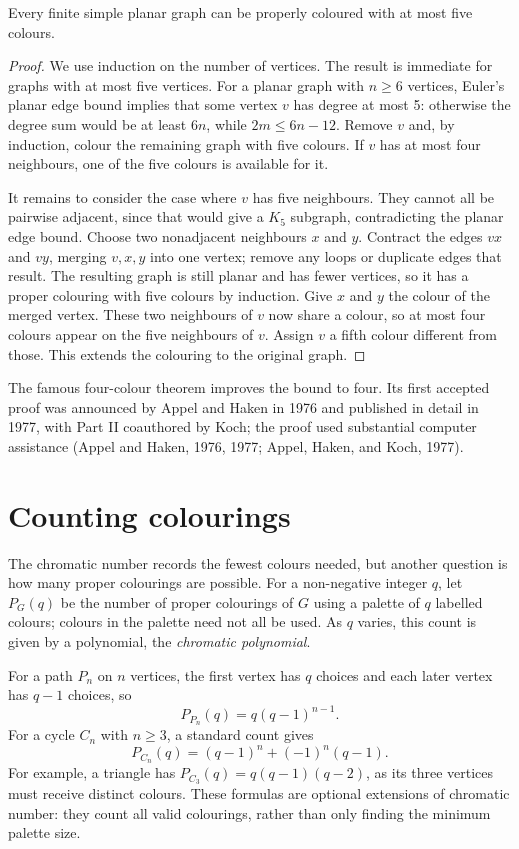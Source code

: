 \begin{theorem}
Every finite simple planar graph can be properly coloured with at most five colours.
\end{theorem}
\begin{proof}
We use induction on the number of vertices. The result is immediate for graphs with at most five vertices. For a planar graph with $n\geq 6$ vertices, Euler's planar edge bound implies that some vertex $v$ has degree at most 5: otherwise the degree sum would be at least $6n$, while $2m\leq 6n-12$. Remove $v$ and, by induction, colour the remaining graph with five colours. If $v$ has at most four neighbours, one of the five colours is available for it.

It remains to consider the case where $v$ has five neighbours. They cannot all be pairwise adjacent, since that would give a $K_5$ subgraph, contradicting the planar edge bound. Choose two nonadjacent neighbours $x$ and $y$. Contract the edges $vx$ and $vy$, merging $v,x,y$ into one vertex; remove any loops or duplicate edges that result. The resulting graph is still planar and has fewer vertices, so it has a proper colouring with five colours by induction. Give $x$ and $y$ the colour of the merged vertex. These two neighbours of $v$ now share a colour, so at most four colours appear on the five neighbours of $v$. Assign $v$ a fifth colour different from those. This extends the colouring to the original graph.
\end{proof}

The famous four-colour theorem improves the bound to four. Its first accepted proof was announced by Appel and Haken in 1976 and published in detail in 1977, with Part II coauthored by Koch; the proof used substantial computer assistance (Appel and Haken, 1976, 1977; Appel, Haken, and Koch, 1977).

\section*{\Enrichment{} Counting colourings}
The chromatic number records the fewest colours needed, but another question is how many proper colourings are possible. For a non-negative integer $q$, let $P_G(q)$ be the number of proper colourings of $G$ using a palette of $q$ labelled colours; colours in the palette need not all be used. As $q$ varies, this count is given by a polynomial, the \emph{chromatic polynomial}.

For a path $P_n$ on $n$ vertices, the first vertex has $q$ choices and each later vertex has $q-1$ choices, so
\[
P_{P_n}(q)=q(q-1)^{n-1}.
\]
For a cycle $C_n$ with $n\geq 3$, a standard count gives
\[
P_{C_n}(q)=(q-1)^n+(-1)^n(q-1).
\]
For example, a triangle has $P_{C_3}(q)=q(q-1)(q-2)$, as its three vertices must receive distinct colours. These formulas are optional extensions of chromatic number: they count all valid colourings, rather than only finding the minimum palette size.

